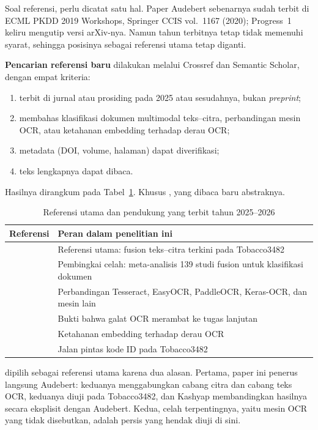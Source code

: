 Soal referensi, perlu dicatat satu hal. Paper Audebert sebenarnya sudah terbit di ECML
PKDD 2019 Workshops, Springer CCIS vol.~1167 (2020); Progress~1 keliru mengutip versi
arXiv-nya. Namun tahun terbitnya tetap tidak memenuhi syarat, sehingga posisinya sebagai
referensi utama tetap diganti.

\textbf{Pencarian referensi baru} dilakukan melalui Crossref dan Semantic Scholar, dengan
empat kriteria:
\begin{enumerate}
  \item terbit di jurnal atau prosiding pada 2025 atau sesudahnya, bukan
  \textit{preprint};
  \item membahas klasifikasi dokumen multimodal teks--citra, perbandingan mesin OCR, atau
  ketahanan embedding terhadap derau OCR;
  \item metadata (DOI, volume, halaman) dapat diverifikasi;
  \item teks lengkapnya dapat dibaca.
\end{enumerate}
Hasilnya dirangkum pada Tabel~\ref{tab:referensi-baru}. Khusus \textcite{larson2025},
yang dibaca baru abstraknya.

\begin{table}[H]
  \centering
  \caption{Referensi utama dan pendukung yang terbit tahun 2025--2026}
  \label{tab:referensi-baru}
  \fontsize{10}{12}\selectfont
  \begin{tabularx}{\textwidth}{|l|>{\raggedright\arraybackslash}X|}
    \hline
    \textbf{Referensi} & \textbf{Peran dalam penelitian ini} \\ \hline
    \textcite{kashyap2026} & Referensi utama: fusion teks--citra terkini pada
    Tobacco3482 \\ \hline
    \textcite{mironczuk2026} & Pembingkai celah: meta-analisis 139 studi fusion untuk
    klasifikasi dokumen \\ \hline
    \textcite{francis2025} & Perbandingan Tesseract, EasyOCR, PaddleOCR, Keras-OCR, dan
    mesin lain \\ \hline
    \textcite{zhang2025} & Bukti bahwa galat OCR merambat ke tugas lanjutan \\ \hline
    \textcite{michail2025} & Ketahanan embedding terhadap derau OCR \\ \hline
    \textcite{larson2025} & Jalan pintas kode ID pada Tobacco3482 \\ \hline
  \end{tabularx}
\end{table}

\textcite{kashyap2026} dipilih sebagai referensi utama karena dua alasan. Pertama, paper
ini penerus langsung Audebert: keduanya menggabungkan cabang citra dan cabang teks OCR,
keduanya diuji pada Tobacco3482, dan Kashyap membandingkan hasilnya secara eksplisit
dengan Audebert. Kedua, celah terpentingnya, yaitu mesin OCR yang tidak disebutkan, adalah
persis yang hendak diuji di sini.


